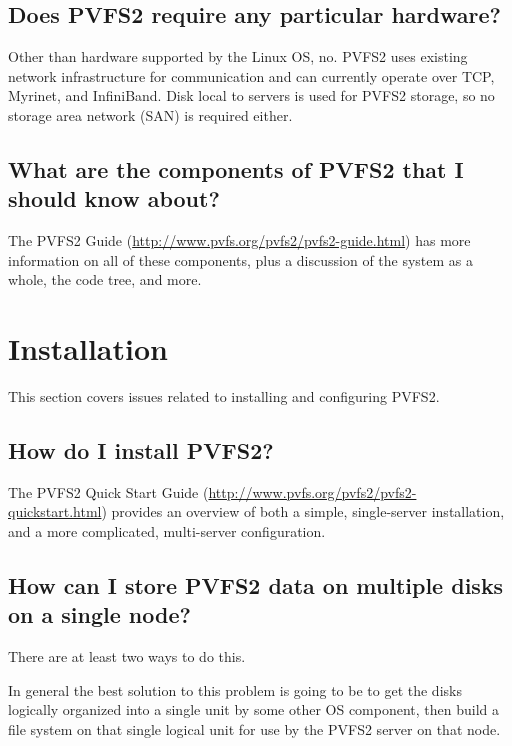 \documentclass[11pt,letterpaper]{article}
\begin{document}
\subsection{Does PVFS2 require any particular hardware?}

Other than hardware supported by the Linux OS, no.  PVFS2 uses existing
network infrastructure for communication and can currently operate over TCP,
Myrinet, and InfiniBand.  Disk local to servers is used for PVFS2 storage, so
no storage area network (SAN) is required either.

\subsection{What are the components of PVFS2 that I should know about?}

The PVFS2 Guide (\url{http://www.pvfs.org/pvfs2/pvfs2-guide.html}) has more
information on all of these components, plus a discussion of the system as a
whole, the code tree, and more.

%
%
\section{Installation}

This section covers issues related to installing and configuring PVFS2.

\subsection{How do I install PVFS2?}

The PVFS2 Quick Start Guide
(\url{http://www.pvfs.org/pvfs2/pvfs2-quickstart.html}) provides an overview
of both a simple, single-server installation, and a more complicated,
multi-server configuration.

\subsection{How can I store PVFS2 data on multiple disks on a single node?}
\label{sec:multiple-disks}

There are at least two ways to do this.

In general the best solution to this problem is going to be to get the disks
logically organized into a single unit by some other OS component, then build
a file system on that single logical unit for use by the PVFS2 server on that
node.
\end{document}
